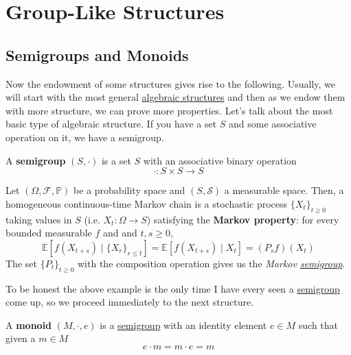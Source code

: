 \section{Group-Like Structures} 

\subsection{Semigroups and Monoids}

  Now the endowment of some structures gives rise to the following. Usually, we will start with the most general \hyperref[def:algebraic-structure]{algebraic structures} and then as we endow them with more structure, we can prove more properties. Let's talk about the most basic type of algebraic structure. If you have a set $S$ and some associative operation on it, we have a semigroup. 

  \begin{definition}[Semigroup]
    \label{def:semigroup}
    A \textbf{semigroup} $(S, \cdot)$ is a set $S$ with an associative binary operation 
    \begin{equation}
      \cdot : S \times S \to S
    \end{equation}
  \end{definition} 

  \begin{example}
    \label{ex:continuous-time-markov-chain}
    Let $(\Omega, \mathcal{F}, \mathbb{P})$ be a probability space and $(S, \mathcal{S})$ a measurable space. Then, a homogeneous continuous-time Markov chain is a stochastic process $\{X_t\}_{t \geq 0}$ taking values in $S$ (i.e. $X_t: \Omega \rightarrow S$) satisfying the \textbf{Markov property}: for every bounded measurable $f$ and and $t, s \geq 0$, 
    \begin{equation}
      \mathbb{E}[ f(X_{t + s}) \mid \{X_r\}_{r \leq t} ] = \mathbb{E}[ f(X_{t + s}) \mid X_t ] = (P_s f)(X_t)
    \end{equation}
    The set $\{P_t\}_{t \geq 0}$ with the composition operation gives us the \textit{Markov \hyperref[def:semigroup]{semigroup}}. 
  \end{example} 

  To be honest the above example is the only time I have every seen a \hyperref[def:semigroup]{semigroup} come up, so we proceed immediately to the next structure. 

  \begin{definition}[Monoid]
    \label{def:monoid}
    A \textbf{monoid} $(M, \cdot, e)$ is a \hyperref[def:semigroup]{semigroup} with an identity element $e \in M$ such that given a $m \in M$
    \begin{equation}
      e \cdot m = m \cdot e = m
    \end{equation}
  \end{definition} 

